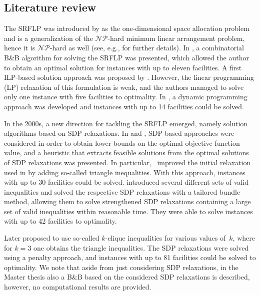 \documentclass{article}
\newcommand{\BB}{B\&B\xspace}
\newcommand{\SRFLP}{SRFLP\xspace}
\begin{document}
\subsection{Literature review}\label{sec:literature}
The \SRFLP was introduced by \citet{SIMMONS1969} as the one-dimensional space allocation problem and is a generalization of the $\mathcal{NP}$-hard minimum linear arrangement problem, hence it is $\mathcal{NP}$-hard as well (see, e.g., \citet{Garey1976} for further details). In \citet{SIMMONS1969}, a combinatorial \BB algorithm for solving the \SRFLP was presented, which allowed the author to obtain an optimal solution for instances with up to eleven facilities. A first ILP-based solution approach was proposed by \citet{LOVE1976}. However, the linear programming (LP) relaxation of this formulation is weak, and the authors managed to solve only one instance with five facilities to optimality. In \citet{Picard1981}, a dynamic programming approach was developed and instances with up to 14 facilities could be solved.

In the 2000s, a new direction for tackling the \SRFLP emerged, namely solution algorithms based on SDP relaxations.
In \citet{anjos_semidefinite_2005} and \citet{anjos_computing_2008}, SDP-based approaches were considered in order to obtain lower bounds on the optimal objective function value, and a heuristic that extracts feasible solutions from the optimal solutions of SDP relaxations was presented. In particular,~\citet{anjos_computing_2008} improved the initial relaxation used in \citet{anjos_semidefinite_2005} by adding so-called triangle inequalities. With this approach, instances with up to 30 facilities could be solved.
\citet{hungerlander_semidefinite_2013} introduced several different sets of valid inequalities and solved the respective SDP relaxations with a tailored bundle method, allowing them to solve strengthened SDP relaxations containing a large set of valid inequalities within reasonable time. They were able to solve instances with up to 42 facilities to optimality. 

Later \citet{Schwiddessen2020, Schwiddessen2022} proposed to use so-called $k$-clique inequalities for various values of~$k$, where for $k=3$ one obtains the triangle inequalities. The SDP relaxations were solved using a penalty approach, and instances with up to 81 facilities could be solved to optimality. We note that aside from just considering SDP relaxations, in the Master thesis \citet{Schwiddessen2020} also a \BB based on the considered SDP relaxations is described, however, no computational results are provided.
\end{document}
